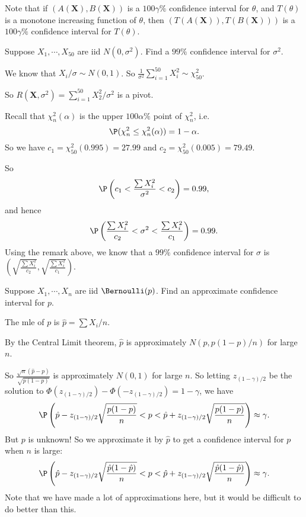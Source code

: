 \documentclass[a4paper]{article}
\begin{document}
Note that if $(A(\mathbf{X}), B(\mathbf{X}))$ is a $100\gamma\%$ confidence interval for $\theta$, and $T(\theta)$ is a monotone increasing function of $\theta$, then $(T(A(\mathbf{X})), T(B(\mathbf{X})))$ is a $100\gamma\%$ confidence interval for $T(\theta)$.
\begin{eg}
  Suppose $X_1, \cdots, X_{50}$ are iid $N(0, \sigma^2)$. Find a $99\%$ confidence interval for $\sigma^2$.

  We know that $X_i/\sigma \sim N(0, 1)$. So $\displaystyle\frac{1}{\sigma^2}\sum_{i = 1}^{50}X_i^2 \sim \chi^2_{50}$.

  So $R(\mathbf{X}, \sigma^2) = \sum_{i = 1}^{50} X_2^2/\sigma^2$ is a pivot.

  Recall that $\chi_n^2(\alpha)$ is the upper $100\alpha\%$ point of $\chi_n^2$, i.e.\
  \[
    \P(\chi_n^2 \leq \chi_n^2(\alpha)) = 1 - \alpha.
  \]
  So we have $c_1 = \chi_{50}^2(0.995) = 27.99$ and $c_2 = \chi_{50}^2(0.005) = 79.49$.

  So
  \[
    \P \left(c_1 < \frac{\sum X_i^2}{\sigma^2} < c_2\right) = 0.99,
  \]
  and hence
  \[
    \P\left(\frac{\sum X_i^2}{c_2} < \sigma^2 < \frac{\sum X_i^2}{c_1}\right) = 0.99.
  \]
  Using the remark above, we know that a $99\%$ confidence interval for $\sigma$ is $\left(\sqrt{\frac{\sum X_i^2}{c_2}}, \sqrt{\frac{\sum X_i^2}{c_1}}\right)$.
\end{eg}

\begin{eg}
  Suppose $X_1, \cdots, X_n$ are iid $\Bernoulli(p)$. Find an approximate confidence interval for $p$.

  The mle of $p$ is $\hat p = \sum X_i/n$.

  By the Central Limit theorem, $\hat{p}$ is approximately $N(p, p(1 - p)/n)$ for large $n$.

  So $\displaystyle \frac{\sqrt{n}(\hat{p} - p)}{\sqrt{p(1 - p)}}$ is approximately $N(0, 1)$ for large $n$. So letting $z_{(1-\gamma) / 2}$ be the solution to $\Phi(z_{(1-\gamma) / 2}) - \Phi(-z_{(1-\gamma) / 2}) = 1 - \gamma$, we have
  \[
    \P\left(\hat p - z_{(1 - \gamma)/2}\sqrt{\frac{p(1 - p)}{n}} < p < \hat{p} + z_{(1 - \gamma)/2}\sqrt{\frac{p(1 - p)}{n}}\right)\approx \gamma.
  \]
  But $p$ is unknown! So we approximate it by $\hat{p}$ to get a confidence interval for $p$ when $n$ is large:
  \[
    \P\left(\hat p - z_{(1 - \gamma)/2}\sqrt{\frac{\hat p(1 - \hat p)}{n}} < p < \hat{p} + z_{(1 - \gamma)/2}\sqrt{\frac{\hat p(1 - \hat p)}{n}}\right)\approx \gamma.
  \]
  Note that we have made a lot of approximations here, but it would be difficult to do better than this.
\end{eg}
\end{document}
